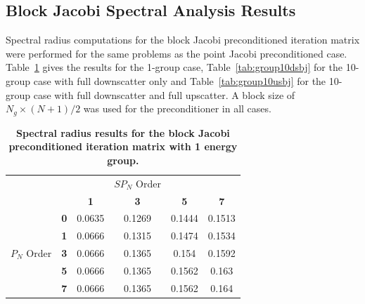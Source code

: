 \subsection{Block Jacobi Spectral Analysis Results}
\label{subsec:spn_analysis_results}
Spectral radius computations for the block Jacobi preconditioned
iteration matrix were performed for the same problems as the point
Jacobi preconditioned case. Table~\ref{tab:group1bj} gives the results
for the 1-group case, Table~\ref{tab:group10dsbj} for the 10-group
case with full downscatter only and Table~\ref{tab:group10usbj} for
the 10-group case with full downscatter and full upscatter. A block
size of $N_g\times(N+1)/2$ was used for the preconditioner in all
cases.
\begin{table}[h!]
  \begin{center}
    \begin{tabular}{cccccc}\hline\hline
      \multicolumn{1}{c}{}& 
      \multicolumn{1}{c}{}& 
      \multicolumn{1}{c}{}& 
      \multicolumn{1}{c}{$SP_N$ Order}& 
      \multicolumn{1}{c}{}& 
      \multicolumn{1}{c}{} \\
       &   & \textbf{1} & \textbf{3} & \textbf{5} & \textbf{7}  \\
       & \textbf{0} & 0.0635 & 0.1269 & 0.1444 & 0.1513 \\
       & \textbf{1} & 0.0666 & 0.1315 & 0.1474 & 0.1534 \\
      $P_N$ Order & \textbf{3} & 0.0666 & 0.1365 & 0.154 & 0.1592 \\
       & \textbf{5} & 0.0666 & 0.1365 & 0.1562 & 0.163 \\
       & \textbf{7} & 0.0666 & 0.1365 & 0.1562 & 0.164 \\
      \hline\hline
    \end{tabular}
  \end{center}
  \caption{\textbf{Spectral radius results for the block Jacobi
      preconditioned iteration matrix with 1 energy group.}}
  \label{tab:group1bj}
\end{table}
